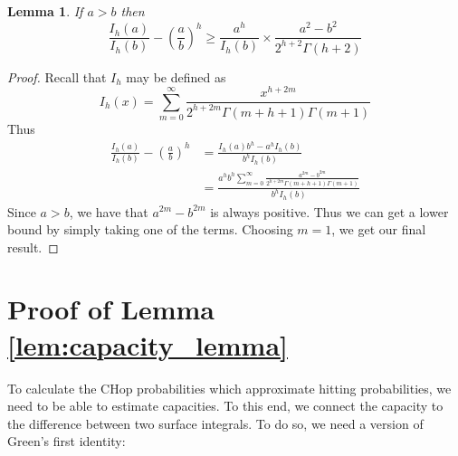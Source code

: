 \documentclass[english, aip, jcp, priprint, graphicx,floatfix]{revtex4-1}
\newtheorem{lemma}{Lemma}
\theoremstyle{plain}
\theoremstyle{definition}
\theoremstyle{plain}
\begin{document}
\begin{lemma}\label{lem:bessel}
If $a>b$ then
    \[
    \frac{I_h ( a)}{I_h (b)} - \left(\frac{a}{b} \right)^h 
    \geq
    \frac{a^h}{I_h(b)}\times\frac{a^{2} -b^{2}}{2^{h+2}\Gamma(h+2)}
    \]
\end{lemma}
\begin{proof}
Recall that $I_h$ may be defined as 
\[
I_h(x) = \sum_{m=0}^\infty \frac{x^{h+2m}}{2^{h+2m}\Gamma(m+h+1)\Gamma(m+1)}
\]
Thus
\begin{align*}
\frac{I_h ( a)}{I_h (b)} - \left(\frac{a}{b} \right)^h 
    &= \frac{I_h(a)b^h-a^hI_h(b)}{b^hI_h(b)}  \\
    &= \frac{a^hb^h\sum_{m=0}^\infty \frac{a^{2m} -b^{2m}}{2^{h+2m}\Gamma(m+h+1)\Gamma(m+1)}}{b^{h}I_h(b)}
\end{align*}
Since $a>b$, we have that $a^{2m} -b^{2m}$ is always positive.  Thus we can get a lower bound by simply taking one of the terms.  Choosing $m=1$, we get our final result.
\end{proof}

                                                            


\section{Proof of Lemma \ref{lem:capacity_lemma}}\label{sec:proof_lemma}

To calculate the CHop probabilities which approximate hitting probabilities, we need to be able to estimate capacities.  To this end, we connect the capacity to the difference between two surface integrals.  To do so, we need a version of Green's first identity:
\end{document}
